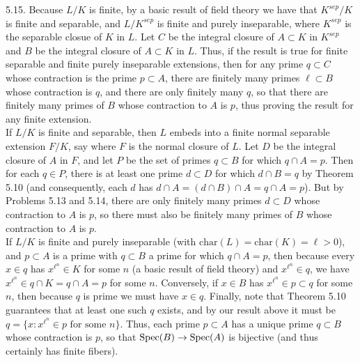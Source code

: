 \documentclass[11pt]{article}
\begin{document}
\num{5.15.} Because $L/K$ is finite, by a basic result of field theory we have that $K^{sep}/K$ is finite and separable, and $L/K^{sep}$ is finite and purely inseparable, where $K^{sep}$ is the separable closue of $K$ in $L$. Let $C$ be the integral closure of $A\subset K$ in $K^{sep}$ and $B$ be the integral closure of $A\subset K$ in $L$. Thus, if the result is true for finite separable and finite purely inseparable extensions, then for any prime $q
\subset C$ whose contraction is the prime $p\subset A$, there are finitely many primes $\ell\subset B$ whose contraction is $q$, and there are only finitely many $q$, so that there are finitely many primes of $B$ whose contraction to $A$ is $p$, thus proving the result for any finite extension.\\

If $L/K$ is finite and separable, then $L$ embeds into a finite normal separable extension $F/K$, say where $F$ is the normal closure of $L$. Let $D$ be the integral closure of $A$ in $F$, and let $P$ be the set of primes $q\subset B$ for which $q\cap A=p$. Then for each $q\in P$, there is at least one prime $d\subset D$ for which $d\cap B=q$ by Theorem 5.10 (and consequently, each $d$ has $d\cap A= (d\cap B)\cap A=q\cap A=p$). But by Problems 5.13 and 5.14, there are only finitely many primes $d\subset D$ whose contraction to $A$ is $p$, so there must also be finitely many primes of $B$ whose contraction to $A$ is $p$.\\

If $L/K$ is finite and purely inseparable (with $\text{char}(L)=\text{char}(K)=\ell>0$), and $p\subset A$ is a prime with $q\subset B$ a prime for which $q\cap A=p$, then because every $x\in q$ has $x^{\ell^n}\in K$ for some $n$ (a basic result of field theory) and $x^{\ell^n}\in q$, we have $x^{\ell^n}\in q\cap K=q\cap A=p$ for some $n$. Conversely, if $x\in B$ has $x^{\ell^n}\in p\subset q$ for some $n$, then because $q$ is prime we must have $x\in q$. Finally, note that Theorem 5.10 guarantees that at least one such $q$ exists, and by our result above it must be $q=\{x:x^{\ell^n}\in p\text{ for some $n$}\}$. Thus, each prime $p\subset A$ has a unique prime $q\subset B$ whose contraction is $p$, so that $\operatorname{Spec}(B)\rightarrow\operatorname{Spec}(A)$ is bijective (and thus certainly has finite fibers).
\end{document}
